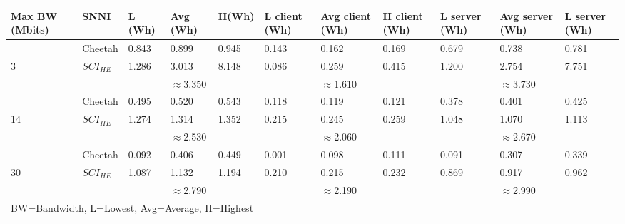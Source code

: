 \begin{tabular}{lllllllllll}
Max BW (Mbits) & SNNI    & L (Wh) & Avg (Wh) & H(Wh) & L client (Wh) & Avg client (Wh) & H client (Wh) & L server (Wh) & Avg server (Wh) & L server (Wh) \\ \hline
               & Cheetah & 0.843  & 0.899    & 0.945 & 0.143         & 0.162           & 0.169         & 0.679         & 0.738           & 0.781         \\
3              & $SCI_{HE}$ & 1.286  & 3.013    & 8.148 & 0.086         & 0.259           & 0.415         & 1.200         & 2.754           & 7.751         \\ \cline{3-11} 
               &         &        & $\approx$3.350    &       &               & $\approx$1.610           &               &               & $\approx$3.730           &               \\ \hline
               & Cheetah & 0.495  & 0.520    & 0.543 & 0.118         & 0.119           & 0.121         & 0.378         & 0.401           & 0.425         \\
14             & $SCI_{HE}$ & 1.274  & 1.314    & 1.352 & 0.215         & 0.245           & 0.259         & 1.048         & 1.070           & 1.113         \\ \cline{3-11} 
               &         &        & $\approx$2.530    &       &               & $\approx$2.060           &               &               & $\approx$2.670           &               \\ \hline
               & Cheetah & 0.092  & 0.406    & 0.449 & 0.001         & 0.098           & 0.111         & 0.091         & 0.307           & 0.339         \\
30             & $SCI_{HE}$ & 1.087  & 1.132    & 1.194 & 0.210         & 0.215           & 0.232         & 0.869         & 0.917           & 0.962         \\ \cline{3-11} 
               &         &        & $\approx$2.790    &       &               & $\approx$2.190           &               &               & $\approx$2.990           &               \\ \hline
\multicolumn{11}{l}{BW=Bandwidth, L=Lowest, Avg=Average, H=Highest}                                                                                     
\end{tabular}